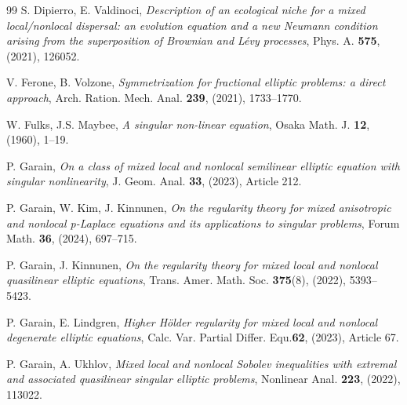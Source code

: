 \documentclass[11pt,a4paper]{amsart}
\theoremstyle{definition}
\theoremstyle{plain}
\numberwithin{equation}{section}
\begin{document}
{\begin{thebibliography}{99}
S. Dipierro, E. Valdinoci,
{\em Description of an ecological niche for a mixed local/nonlocal dispersal: an evolution equation and a new Neumann condition arising from the superposition of Brownian and L\'{e}vy processes},
Phys. A. {\bf 575}, (2021), 126052.



V. Ferone, B. Volzone,
{\em Symmetrization for fractional elliptic problems: a direct approach},
Arch. Ration. Mech. Anal. {\bf 239}, (2021), 1733--1770.


W. Fulks, J.S. Maybee, 
{\em A singular non-linear equation},
Osaka Math. J. {\bf 12},(1960), 1--19.

P. Garain,
{\em On a class of mixed local and nonlocal semilinear elliptic equation with singular nonlinearity}, 
J. Geom. Anal. {\bf 33}, (2023), Article 212. 

P. Garain, W. Kim, J. Kinnunen,
{\em On the regularity theory for mixed anisotropic and nonlocal p-Laplace equations and its applications to singular problems},
Forum Math. {\bf 36}, (2024), 697--715.

P. Garain, J. Kinnunen,
{\em On the regularity theory for mixed local and nonlocal quasilinear elliptic equations}, 
Trans. Amer. Math. Soc. {\bf 375}(8), (2022), 5393--5423.
 
P. Garain, E. Lindgren, 
{\em Higher Hölder regularity for mixed local and nonlocal degenerate elliptic equations}, 
Calc. Var. Partial Differ. Equ.{\bf 62}, (2023), Article 67.
 
P. Garain, A. Ukhlov,
{\em Mixed local and nonlocal Sobolev inequalities with extremal and associated quasilinear singular elliptic problems}, 
Nonlinear Anal. {\bf 223}, (2022), 113022.





\end{thebibliography}}
\end{document}
